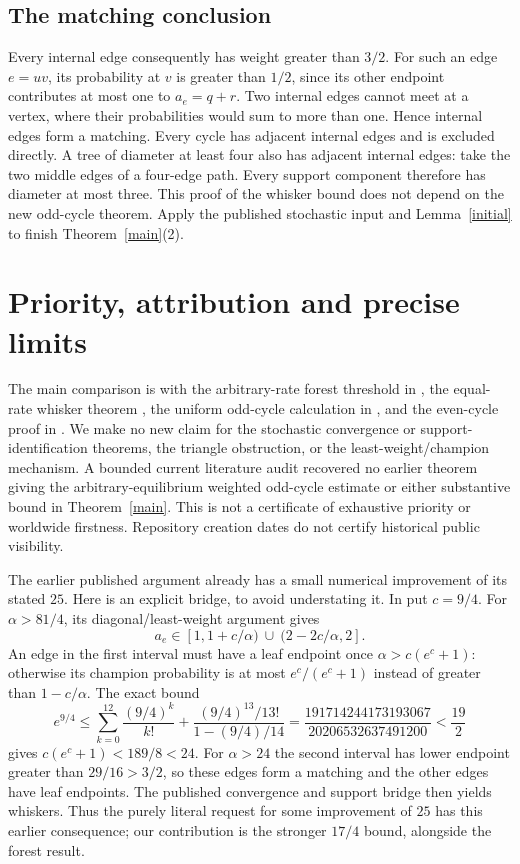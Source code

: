 \documentclass[11pt]{article}
\begin{document}
\subsection{The matching conclusion}
Every internal edge consequently has weight greater than $3/2$.
For such an edge $e=uv$, its probability at $v$ is greater than $1/2$,
since its other endpoint contributes at most one to $a_e=q+r$.
Two internal edges cannot meet at a vertex, where their probabilities
would sum to more than one. Hence internal edges form a matching.
Every cycle has adjacent internal edges and is excluded directly.
A tree of diameter at least four also has adjacent internal edges:
take the two middle edges of a four-edge path. Every support component
therefore has diameter at most three. This proof of the whisker bound
does not depend on the new odd-cycle theorem. Apply the published
stochastic input and Lemma~\ref{initial} to finish Theorem~\ref{main}(2).

\section{Priority, attribution and precise limits}\label{priority}
The main comparison is with the arbitrary-rate forest threshold in
\cite[Theorem~3 and Corollary~1]{HK}, the equal-rate whisker theorem
\cite[Theorem~2(a)]{HK}, the uniform odd-cycle calculation in
\cite[Proposition~2(iv)]{VHHKR}, and the even-cycle proof in
\cite[Lemma~2]{HHK}. We make no new claim for the stochastic convergence
or support-identification theorems, the triangle obstruction, or the
least-weight/champion mechanism. A bounded current literature audit
recovered no earlier theorem giving the arbitrary-equilibrium weighted
odd-cycle estimate or either substantive bound in Theorem~\ref{main}.
This is not a certificate of exhaustive priority or worldwide firstness.
Repository creation dates do not certify historical public visibility.

The earlier published argument already has a small numerical improvement
of its stated $25$. Here is an explicit bridge, to avoid understating it.
In \cite[Section~5.1, Lemmas~5--7]{HK} put $c=9/4$.
For $\alpha>81/4$, its diagonal/least-weight argument gives
\[
 a_e\in[1,1+c/\alpha)\ \cup\ (2-2c/\alpha,2].
\]
An edge in the first interval must have a leaf endpoint once
$\alpha>c(e^c+1)$: otherwise its champion probability is at most
$e^c/(e^c+1)$ instead of greater than $1-c/\alpha$.
The exact bound
\[
 e^{9/4}\le\sum_{k=0}^{12}\frac{(9/4)^k}{k!}
 +\frac{(9/4)^{13}/13!}{1-(9/4)/14}
 =\frac{191714244173193067}{20206532637491200}<\frac{19}2
\]
gives $c(e^c+1)<189/8<24$. For $\alpha>24$ the second interval has
lower endpoint greater than $29/16>3/2$, so these edges form a matching
and the other edges have leaf endpoints. The published convergence
and support bridge then yields whiskers. Thus the purely literal request
for some improvement of $25$ has this earlier consequence; our
contribution is the stronger $17/4$ bound, alongside the forest result.
\end{document}

